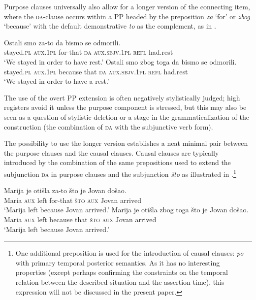 \documentclass[output=paper,
colorlinks,
citecolor=brown,
newtxmath
]{langscibook}
\begin{document}
\noindent Purpose clauses universally also allow for a longer version of the connecting item, where the \textsc{da}-clause occurs within a PP headed by the preposition \textit{za} `for' or \textit{zbog} `because' with the default demonstrative \textit{to} as the complement, as in .

\ea\label{ex:Zato-da}
    \ea \gll Ostali smo za-to da bismo se odmorili.\\
    stayed.\textsc{pl} \textsc{aux.1pl} for-that \textsc{da} \textsc{aux.sbjv.1pl} \textsc{refl} had.rest\\
    \glt `We stayed in order to have rest.'
    \ex \gll Ostali smo zbog toga da bismo se odmorili.\\
    stayed.\textsc{pl} \textsc{aux.1pl} because that \textsc{da} \textsc{aux.sbjv.1pl} \textsc{refl} had.rest\\
    \glt `We stayed in order to have a rest.'
\z\z

\noindent The use of the overt PP extension is often negatively stylistically judged; high registers avoid it unless the purpose component is stressed, but this may also be seen as a question of stylistic deletion or a stage in the grammaticalization of the construction (the combination of \textsc{da} with the subjunctive verb form).

The possibility to use the longer version establishes a neat minimal pair between the purpose clauses and the causal clauses. Causal clauses are typically introduced by the combination of the same prepositions used to extend the subjunction \textsc{da} in purpose clauses and the subjunction \textit{što} as illustrated in .\footnote{One additional preposition is used for the introduction of causal clauses: \textit{po} with primary temporal posterior semantics. As it has no interesting properties (except perhaps confirming the constraints on the temporal relation between the described situation and the assertion time), this expression will not be discussed in the present paper.}

\ea\label{Caus-claus1}
	\ea \gll Marija je otišla za-to što je Jovan došao.\\
    Maria \textsc{aux} left for-that \textsc{što} \textsc{aux} Jovan arrived\\
    \glt `Marija left because Jovan arrived.'\label{ex:Caus-claus-a}
	\ex \gll Marija je otišla zbog toga što je Jovan došao.\\
    Maria \textsc{aux} left because that \textsc{što} \textsc{aux} Jovan arrived\\
    \glt `Marija left because Jovan arrived.'\label{ex:Caus-claus-b}
\z\z
\end{document}
